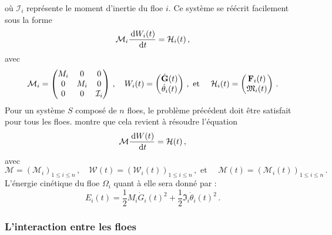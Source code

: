 où $\mathcal{I}_i$ représente le moment d'inertie du floe $i$. Ce système se réécrit facilement sous la forme 
\begin{align}    
    \mathcal{M}_i \frac{\diff W_i(t)}{\diff t} = \mathcal{H}_i(t) \,,
\end{align}
avec 
$$
\mathcal{M}_i = 
\begin{pmatrix}
    M_i & 0 & 0 \\ 0 & M_i & 0 \\ 0 & 0 & \mathcal{I}_i
\end{pmatrix} \,, \quad
W_i(t) = 
\begin{pmatrix}
    \dot{\bm{\mathrm{G}}}(t) \\ \dot{\theta}_i(t)
\end{pmatrix} \,,
\text{ et } \quad \mathcal{H}_i(t) = 
\begin{pmatrix}
    \bm{\mathrm{F}}_i(t) \\ \mathfrak{M}_i(t)
\end{pmatrix} \,.
$$
Pour un système $S$ composé de $n$ floes, le problème précédent doit être satisfait pour tous les floes. \parencite[p.18]{rabatel2015thesis} montre que cela revient à résoudre l'équation
\begin{align} \label{eq:bilan1}
    \mathcal{M} \frac{\diff W(t)}{\diff t} = \mathcal{H}(t) \,,
\end{align}
avec 
$$
\mathcal{M} = (\mathcal{M}_i)_{1\leq i \leq n } \,, \quad
\mathcal{W}(t) = (\mathcal{W}_i(t))_{1\leq i \leq n } \,, \text{ et } \quad
\mathcal{M}(t) = (\mathcal{M}_i(t))_{1\leq i \leq n }  \,.
$$
L'énergie cinétique du floe $\Omega_i$ quant à elle sera donné par :
$$
E_i(t) = \frac{1}{2}M_i \dot{G}_i(t)^2 + \frac{1}{2}\mathfrak{I}_i \dot{\theta}_i(t)^2 \,. 
$$ 


\subsubsection{L'interaction entre les floes}


